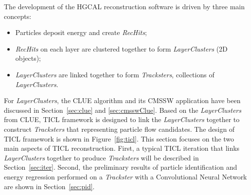 \noindent The development of the HGCAL reconstruction software is driven by three main concepts:

\begin{itemize}
    \item Particles deposit energy and create \emph{RecHits};
    \item \emph{RecHits} on each layer are clustered together to form \emph{LayerClusters} (2D objects);
    \item \emph{LayerClusters} are linked together to form \emph{Tracksters}, collections of \emph{LayerClusters}.
\end{itemize}


\noindent For \emph{LayerClusters}, the CLUE algorithm and its CMSSW application have been discussed in Section~\ref{sec:clue} and \ref{sec:cmsswClue}. Based on the \emph{LayerClusters} from CLUE, TICL framework is designed to link the \emph{LayerClusters} together to construct \emph{Tracksters} that representing particle flow candidates.
The design of TICL framework is shown in Figure~\ref{fig:ticl}. This section focuses on the two main aspects of TICL reconstruction. First, a typical TICL iteration that links \emph{LayerClusters} together to produce \emph{Tracksters} will be described in Section~\ref{sec:iter}.  Second, the preliminary results of particle identification and energy regression performed on a \emph{Trackster} with a Convolutional Neural Network are shown in Section~\ref{sec:pid}.

